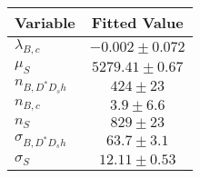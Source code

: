 \begin{tabular}[t]{lc}
\hline
Variable &Fitted Value\\
\hline\hline
$\lambda_{B,c}$&$-0.002\pm0.072$\\
\hline
$\mu_S$&$5279.41\pm0.67$\\
\hline
$n_{B, D^* D_s h}$&$424\pm23$\\
\hline
$n_{B,c}$&$3.9\pm6.6$\\
\hline
$n_S$&$829\pm23$\\
\hline
$\sigma_{B, D^* D_s h}$&$63.7\pm3.1$\\
\hline
$\sigma_S$&$12.11\pm0.53$\\
\hline
\end{tabular}